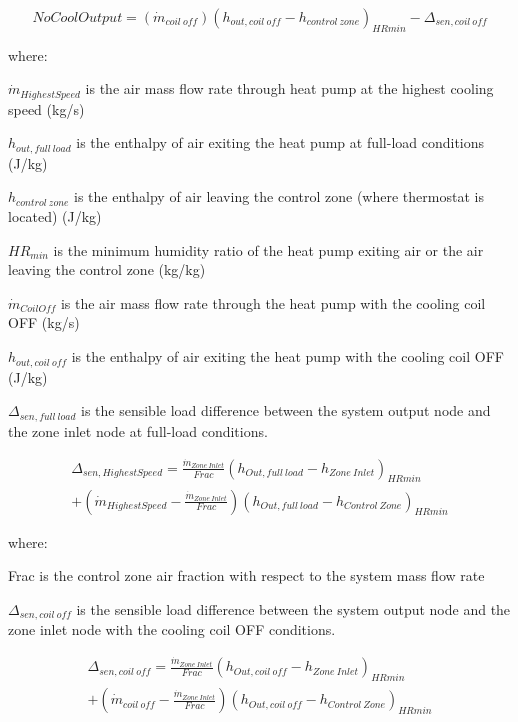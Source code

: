 \begin{equation}
NoCoolOutput = \left( {{{\dot m}_{coil~off}}} \right){\left( {{h_{out,coil~off}} - {h_{control~zone}}} \right)_{HRmin}} - {\Delta_{sen,coil~off}}
\end{equation}

where:

\({\dot m}_{HighestSpeed}\) is the air mass flow rate through heat pump at the highest cooling speed (kg/s)

\(h_{out,full~load}\) is the enthalpy of air exiting the heat pump at full-load conditions (J/kg)

\(h_{control~zone}\) is the enthalpy of air leaving the control zone (where thermostat is located) (J/kg)

\(HR_{min}\) is the minimum humidity ratio of the heat pump exiting air or the air leaving the control zone (kg/kg)

\({\dot m}_{CoilOff}\) is the air mass flow rate through the heat pump with the cooling coil OFF (kg/s)

\(h_{out,coil~off}\) is the enthalpy of air exiting the heat pump with the cooling coil OFF (J/kg)

\(\Delta_{sen,full~load}\) is the sensible load difference between the system output node and the zone inlet node at full-load conditions.

\begin{equation}
\begin{split}
{\Delta_{sen,HighestSpeed}} = \frac{{{{\dot m}_{Zone~Inlet}}}}{Frac}{\left( {{h_{Out,full~load}} - {h_{Zone~Inlet}}} \right)_{HRmin}} \\
+ \left( {{{\dot m}_{HighestSpeed}} - \frac{{{{\dot m}_{Zone~Inlet}}}}{Frac}} \right){\left( {h_{Out,full~load} - {h_{Control~Zone}}} \right)_{HRmin}}
\end{split}
\end{equation}

where:

Frac is the control zone air fraction with respect to the system mass flow rate

\(\Delta_{sen,coil~off}\) is the sensible load difference between the system output node and the zone inlet node with the cooling coil OFF conditions.

\begin{equation}
\begin{split}
{\Delta_{sen,coil~off}} = \frac{{{{\dot m}_{Zone~Inlet}}}}{{Frac}}{\left( {{h_{Out,coil~off}} - {h_{Zone~Inlet}}} \right)_{HRmin}} \\
+ \left( {{{\dot m}_{coil~off}} - \frac{{{{\dot m}_{Zone~Inlet}}}}{{Frac}}} \right){\left( {{h_{Out,coil~off}} - {h_{Control~Zone}}} \right)_{HRmin}}
\end{split}
\end{equation}

